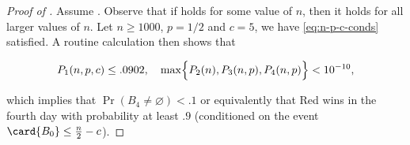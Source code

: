 \documentclass{toc}
\begin{document}
			\begin{proof}[Proof of ]
				Assume . Observe that if  %
				 holds  %
				for some value of $n$, then  %
				it holds  %
				for all larger values of $n$.
				Let $n \ge 1000$, $p = 1/2$ and $c = 5$, we have  %
				\eqref{eq:n-p-c-conds}  %
				satisfied. A routine calculation then shows that
				\begin{linenomath}\begin{equation*}
						P_1(n, p, c)\le   %
						.0902  %
						, \quad \max\Bigl\{P_2(n), P_3(n, p), P_4(n, p)\Bigr\} < 10^{-10} , \end{equation*}\end{linenomath}
				\noindent which implies that $ \Pr \left(B_4\neq \varnothing \right) < .1$ or equivalently that Red wins in the fourth day with probability at least $.9$
				(conditioned on the event $\card{B_0} \le \frac{n}{2} - c$).
			\end{proof}
			
\end{document}
